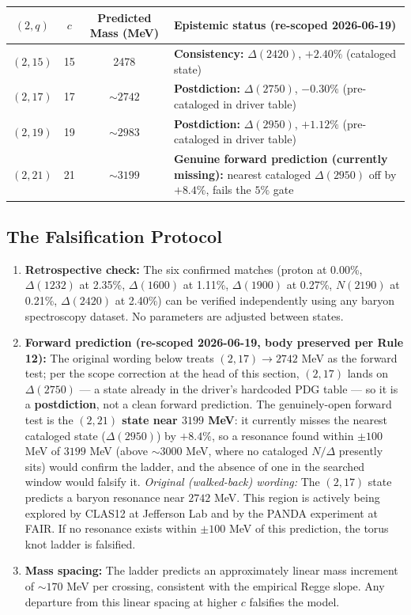 \begin{center}
\begin{tabularx}{\textwidth}{@{}|c|c|c|X|@{}}
\hline
$(2,q)$ & $c$ & Predicted Mass (MeV) & Epistemic status (re-scoped 2026-06-19) \\ \hline
$(2,15)$ & 15 & 2478 & \textbf{Consistency:} $\Delta(2420)$, $+2.40\%$ (cataloged state) \\
$(2,17)$ & 17 & $\sim 2742$ & \textbf{Postdiction:} $\Delta(2750)$, $-0.30\%$ (pre-cataloged in driver table) \\
$(2,19)$ & 19 & $\sim 2983$ & \textbf{Postdiction:} $\Delta(2950)$, $+1.12\%$ (pre-cataloged in driver table) \\
$(2,21)$ & 21 & $\sim 3199$ & \textbf{Genuine forward prediction (currently missing):} nearest cataloged $\Delta(2950)$ off by $+8.4\%$, fails the $5\%$ gate \\ \hline
\end{tabularx}
\label{tab:torus_knot_predictions}
\end{center}

\subsection{The Falsification Protocol}
\begin{enumerate}
    \item \textbf{Retrospective check:} The six confirmed matches (proton at 0.00\%, $\Delta(1232)$ at 2.35\%, $\Delta(1600)$ at 1.11\%, $\Delta(1900)$ at 0.27\%, $N(2190)$ at 0.21\%, $\Delta(2420)$ at 2.40\%) can be verified independently using any baryon spectroscopy dataset. No parameters are adjusted between states.
    \item \textbf{Forward prediction (re-scoped 2026-06-19, body preserved per Rule 12):} The original wording below treats $(2,17) \to 2742$ MeV as the forward test; per the scope correction at the head of this section, $(2,17)$ lands on $\Delta(2750)$ --- a state already in the driver's hardcoded PDG table --- so it is a \textbf{postdiction}, not a clean forward prediction. The genuinely-open forward test is the \textbf{$(2,21)$ state near $3199$ MeV}: it currently misses the nearest cataloged state ($\Delta(2950)$) by $+8.4\%$, so a resonance found within $\pm 100$ MeV of $3199$ MeV (above $\sim 3000$ MeV, where no cataloged $N/\Delta$ presently sits) would confirm the ladder, and the absence of one in the searched window would falsify it. \emph{Original (walked-back) wording:} The $(2,17)$ state predicts a baryon resonance near $2742$ MeV. This region is actively being explored by CLAS12 at Jefferson Lab and by the PANDA experiment at FAIR. If no resonance exists within $\pm 100$ MeV of this prediction, the torus knot ladder is falsified.
    \item \textbf{Mass spacing:} The ladder predicts an approximately linear mass increment of $\sim 170$ MeV per crossing, consistent with the empirical Regge slope. Any departure from this linear spacing at higher $c$ falsifies the model.
\end{enumerate}

